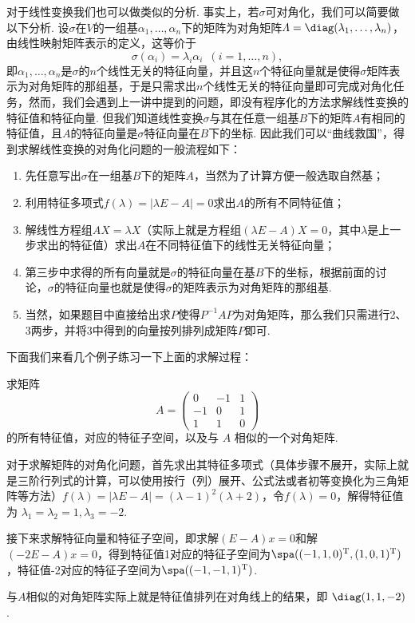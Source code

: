 对于线性变换我们也可以做类似的分析. 事实上，若$\sigma$可对角化，我们可以简要做以下分析. 设$\sigma$在$V$的一组基$\alpha_1,\ldots,\alpha_n$下的矩阵为对角矩阵$\varLambda=\diag(\lambda_1,\ldots,\lambda_n)$，由线性映射矩阵表示的定义，这等价于
\[\sigma(\alpha_i)=\lambda_i\alpha_i\enspace(i=1,\ldots,n),\]
即$\alpha_1,\ldots,\alpha_n$是$\sigma$的$n$个线性无关的特征向量，并且这$n$个特征向量就是使得$\sigma$矩阵表示为对角矩阵的那组基，于是只需求出$n$个线性无关的特征向量即可完成对角化任务，然而，我们会遇到上一讲中提到的问题，即没有程序化的方法求解线性变换的特征值和特征向量. 但我们知道线性变换$\sigma$与其在任意一组基$B$下的矩阵$A$有相同的特征值，且$A$的特征向量是$\sigma$特征向量在$B$下的坐标. 因此我们可以``曲线救国''，得到求解线性变换的对角化问题的一般流程如下：

\begin{enumerate}
    \item 先任意写出$\sigma$在一组基$B$下的矩阵$A$，当然为了计算方便一般选取自然基；

    \item 利用特征多项式$f(\lambda)=|\lambda E-A|=0$求出$A$的所有不同特征值；

    \item 解线性方程组$AX=\lambda X$（实际上就是方程组$(\lambda E-A)X=0$，其中$\lambda$是上一步求出的特征值）求出$A$在不同特征值下的线性无关特征向量；

    \item 第三步中求得的所有向量就是$\sigma$的特征向量在基$B$下的坐标，根据前面的讨论，$\sigma$的特征向量也就是使得$\sigma$的矩阵表示为对角矩阵的那组基.

    \item 当然，如果题目中直接给出求$P$使得$P^{-1}AP$为对角矩阵，那么我们只需进行2、3两步，并将3中得到的向量按列排列成矩阵$P$即可.
\end{enumerate}

下面我们来看几个例子练习一下上面的求解过程：
\begin{example}{}{}
    求矩阵
    \[A=\begin{pmatrix}
            0  & -1 & 1 \\
            -1 & 0  & 1 \\
            1  & 1  & 0
        \end{pmatrix}\]
    的所有特征值，对应的特征子空间，以及与 $A$ 相似的一个对角矩阵.
\end{example}

\begin{solution}
    对于求解矩阵的对角化问题，首先求出其特征多项式（具体步骤不展开，实际上就是三阶行列式的计算，可以使用按行（列）展开、公式法或者初等变换化为三角矩阵等方法）$f(\lambda)=|\lambda E-A|=(\lambda-1)^2(\lambda+2)$，令$f(\lambda)=0$，解得特征值为 $\lambda_1=\lambda_2=1,\lambda_3=-2$.

    接下来求解特征向量和特征子空间，即求解$(E-A)x=0$和解$(-2E-A)x=0$，得到特征值1对应的特征子空间为$\spa((-1,1,0)^{\mathrm{T}},(1,0,1)^{\mathrm{T}})$，特征值-2对应的特征子空间为$\spa((-1,-1,1)^{\mathrm{T}})$.

    与$A$相似的对角矩阵实际上就是特征值排列在对角线上的结果，即 $\diag(1,1,-2)$.
\end{solution}

